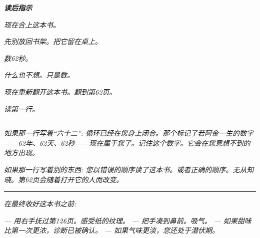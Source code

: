 \documentclass[14pt,openany]{extbook}
\begin{document}
\thispagestyle{empty}
\null
\vfill
\begin{center}

\vspace*{\fill}

\noindent\textit{\textcolor{sangue}{\textbf{读后指示}}}

\vspace{1.5em}

\noindent\textit{现在合上这本书。}

\noindent\textit{先别放回书架。把它留在桌上。}

\vspace{0.8em}

\noindent\textit{数62秒。}

\noindent\textit{什么也不想。只是数。}

\vspace{0.8em}

\noindent\textit{现在重新翻开这本书。翻到第62页。}

\noindent\textit{读第一行。}

\vspace{1em}

\noindent\textcolor{sangue}{\rule{0.15\textwidth}{0.5pt}}

\vspace{1em}

\noindent\textit{如果那一行写着“六十二”: 循环已经在您身上闭合。那个标记了若阿金一生的数字——62年、62天、62秒——现在属于您了。记住这个数字。它会在您意想不到的地方出现。}

\noindent\textit{如果那一行写着别的东西: 您以错误的顺序读了这本书。或者正确的顺序。无从知晓。第62页会随着打开它的人而改变。}

\vspace{1.5em}

\noindent\textcolor{sangue}{\rule{0.15\textwidth}{0.5pt}}

\vspace{1.5em}

\noindent\textit{在最终收好这本书之前:}

\vspace{0.5em}

\noindent\textit{--- 用右手抚过第126页。感受纸的纹理。}
\noindent\textit{--- 把手凑到鼻前。吸气。}
\noindent\textit{--- 如果甜味比第一次更浓，诊断已被确认。}
\noindent\textit{--- 如果气味更淡，您还处于潜伏期。}


\end{center}
\end{document}

